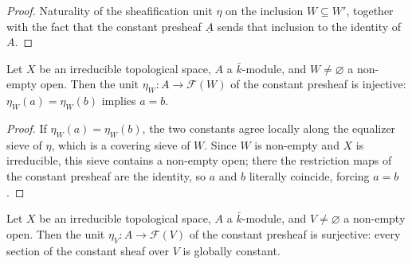 \begin{proof}\leanok
  Naturality of the sheafification unit \(\eta\) on the inclusion
  \(W \subseteq W'\), together with the fact that the constant presheaf
  \(\underline A\) sends that inclusion to the identity of \(A\).
\end{proof}

\begin{lemma}
  \label{lem:toSheafify_const_app_injective_of_ne_bot}
  Let \(X\) be an irreducible topological space, \(A\) a
  \(\bar k\)-module, and \(W \neq \varnothing\) a non-empty open. Then the
  unit \(\eta_W \colon A \to \mathcal F(W)\) of the constant presheaf is
  injective: \(\eta_W(a) = \eta_W(b)\) implies \(a = b\).
\end{lemma}

\begin{proof}\leanok
  If \(\eta_W(a) = \eta_W(b)\), the two constants agree locally along the
  equalizer sieve of \(\eta\), which is a covering sieve of \(W\). Since
  \(W\) is non-empty and \(X\) is irreducible, this sieve contains a
  non-empty open; there the restriction maps of the constant presheaf are
  the identity, so \(a\) and \(b\) literally coincide, forcing
  \(a = b\).
\end{proof}

\begin{lemma}
  \label{lem:toSheafify_const_app_surjective_of_ne_bot}
  Let \(X\) be an irreducible topological space, \(A\) a
  \(\bar k\)-module, and \(V \neq \varnothing\) a non-empty open. Then the
  unit \(\eta_V \colon A \to \mathcal F(V)\) of the constant presheaf is
  surjective: every section of the constant sheaf over \(V\) is globally
  constant.
\end{lemma}

